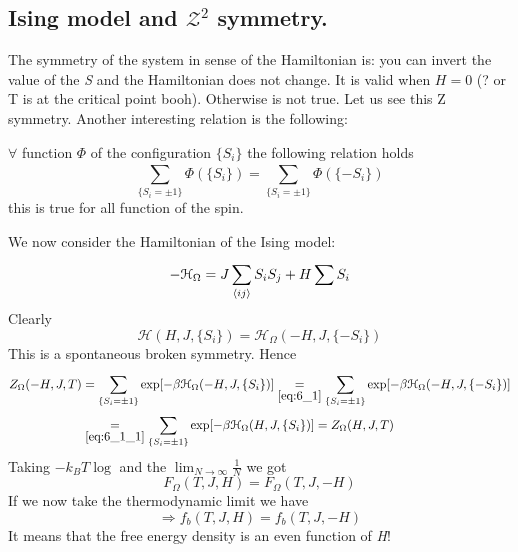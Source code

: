 \documentclass[../main/main.tex]{subfiles}
\begin{document}
\subsection{Ising model and \( \mathcal{Z}^2 \) symmetry. }
The symmetry of the system in sense of the Hamiltonian is: you can invert the value of the \emph{S} and the Hamiltonian does not change. It is valid when \( H=0 \) (? or T is at the critical point booh). Otherwise is not true. Let us see this Z symmetry.
Another interesting relation is the following:
\begin{lemma}[]
\( \forall  \) function \( \Phi  \) of the configuration \( \{ S_i \}   \) the following relation holds
\begin{equation}
  \sum_{ \{S_i = \pm 1\}}^{}  \Phi  (\{S_i\} ) =   \sum_{ \{S_i = \pm 1\}}^{}  \Phi  (\{-S_i\} )
    \label{eq:6_1}
\end{equation}
this is true for all function of the spin.
\end{lemma}
We now consider the Hamiltonian of the Ising model:
\begin{equation}
  - \mathcal{H}_ \Omega  = J \sum_{\expval{ij} }^{} S_i S_j + H \sum_{}^{} S_i
\end{equation}
Clearly
\begin{equation}
  \mathcal{H}(H,J, \{S_i\}) =   \mathcal{H}_ \Omega (-H,J, \{-S_i\})
  \label{eq:6_1_1}
\end{equation}
This is a spontaneous broken symmetry. Hence
\begin{equation}
  \begin{split}
Z_ \Omega  (-H,J,T) &= \sum_{ \{S_i = \pm 1 \}}^{} \exp [-\beta \mathcal{H}_ \Omega  (-H,J, \{S_i\})]  \underset{\eqref{eq:6_1}}{=}   \sum_{ \{S_i = \pm 1 \}}^{} \exp [-\beta \mathcal{H}_ \Omega  (-H,J,\{-S_i\})] \\
&\underset{\eqref{eq:6_1_1}}{=} \sum_{ \{S_i= \pm 1\}}^{} \exp [-\beta \mathcal{H}_ \Omega  (H,J, \{S_i\}) ] = Z_ \Omega (H,J,T)
\end{split}
\end{equation}
Taking \( -k_B T \log  \)  and the \( \lim_{N \rightarrow \infty } \frac{1}{N} \)  we got
\begin{equation}
  F_ \Omega  (T,J,H) = F_ \Omega  (T,J,-H)
  \label{eq:6_2}
\end{equation}
If we now take the thermodynamic limit we have
\begin{equation}
\Rightarrow f_b (T,J,H) = f_b (T,J,-H)
\end{equation}
It means that the free energy density is an even function of \emph{H}!
\end{document}
